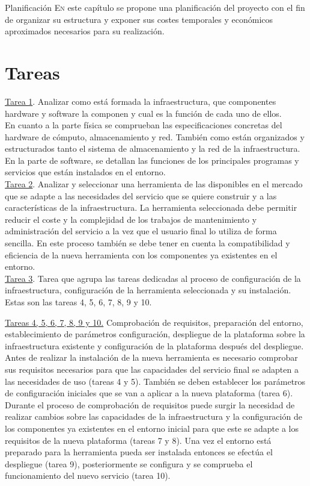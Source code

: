 \begin{chapter}{Planificación}
\label{chap:planificacionProyecto}
\lettrine{E}{n} este capítulo se propone una planificación del proyecto con el fin de organizar su estructura y exponer sus costes temporales y económicos aproximados necesarios para su realización.

\section{Tareas}
\underline{Tarea 1}. Analizar como está formada la infraestructura, que componentes hardware y software la componen y cual es la función de cada uno de ellos.\\
En cuanto a la parte física se comprueban las especificaciones concretas del hardware de cómputo, almacenamiento y red. También como están organizados y estructurados tanto el sistema de almacenamiento y la red de la infraestructura. En la parte de software, se detallan las funciones de los principales programas y servicios que están instalados en el entorno.\\

\underline{Tarea 2}. Analizar y seleccionar una herramienta de las disponibles en el mercado que se adapte a las necesidades del servicio que se quiere construir y a las características de la infraestructura. La herramienta seleccionada debe permitir reducir el coste y la complejidad de los trabajos de mantenimiento y administración del servicio a la vez que el usuario final lo utiliza de forma sencilla. En este proceso también se debe tener en cuenta la compatibilidad y eficiencia de la nueva herramienta con los componentes ya existentes en el entorno.\\

\underline{Tarea 3}. Tarea que agrupa las tareas dedicadas al proceso de configuración de la infraestructura, configuración de la herramienta seleccionada y su instalación. Estas son las tareas 4, 5, 6, 7, 8, 9 y 10.

\underline{ Tareas 4, 5, 6, 7, 8, 9 y 10.}
Comprobación de requisitos, preparación del entorno, establecimiento de parámetros configuración, despliegue de la plataforma sobre la infraestructura existente y configuración de la plataforma después del despliegue. Antes de realizar la instalación de la nueva herramienta es necesario comprobar sus requisitos necesarios para que las capacidades del servicio final se adapten a las necesidades de uso (tareas 4 y 5). También se deben establecer los parámetros de configuración iniciales que se van a aplicar a la nueva plataforma (tarea 6). Durante el proceso de comprobación de requisitos puede surgir la necesidad de realizar cambios sobre las capacidades de la infraestructura y la configuración de los componentes ya existentes en el entorno inicial para que este se adapte a los requisitos de la nueva plataforma (tareas 7 y 8). Una vez el entorno está preparado para la herramienta pueda ser instalada entonces se efectúa el despliegue (tarea 9), posteriormente se configura y se comprueba el funcionamiento del nuevo servicio (tarea 10).\\


\end{chapter}
